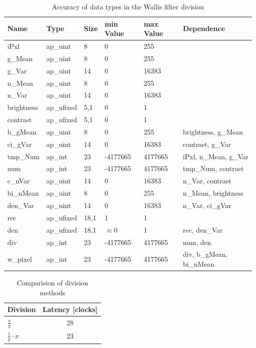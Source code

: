 \begin{table}[t!]
    \centering
    \begin{tabularx}{\textwidth}{l l l l l l}
        \toprule
        Name & Type & Size & min Value & max Value & Dependence \\
        \midrule
        iPxl & ap\_uint & 8 & 0 & 255 & \\
        g\_Mean & ap\_uint & 8 & 0 & 255 &  \\
        g\_Var & ap\_uint & 14 & 0 & 16383 &  \\
        n\_Mean & ap\_uint & 8 & 0 & 255 &  \\
        n\_Var & ap\_uint & 14 & 0 & 16383 &  \\
        brightness & ap\_ufixed & 5,1 & 0 & 1 &  \\
        contrast & ap\_ufixed & 5,1 & 0 & 1 &  \\
        b\_gMean & ap\_uint & 8 & 0 & 255 &  brightness, g\_Mean\\
        ci\_gVar & ap\_uint & 14 & 0 & 16383 &  contrast, g\_Var\\
        tmp\_Num & ap\_int & 23 & -4177665 & 4177665 &  iPxl, n\_Mean, g\_Var \\
        num & ap\_int & 23 & -4177665 & 4177665 &  tmp\_Num, contrast \\
        c\_nVar & ap\_uint & 14 & 0 & 16383 &  n\_Var, contrast \\
        bi\_nMean & ap\_uint & 8 & 0 & 255 &  n\_Mean, brightness \\
        den\_Var & ap\_uint & 14 & 0 & 16383 &  n\_Var, ci\_gVar \\
        rec & ap\_ufixed & 18,1 & 1 & 1 &   \\
        den & ap\_ufixed & 18,1 & $\approx$0 & 1 &  rec, den\_Var \\
        div & ap\_int & 23 & -4177665 & 4177665 &  num, den \\
        w\_pixel & ap\_int & 23 & -4177665 & 4177665 &  div, b\_gMean, bi\_nMean \\
        \bottomrule
    \end{tabularx}
    \caption{Accuracy of data types in the Wallis filter division}
    \label{tab:datatypes}
\end{table}

\begin{table}[tb!]
    \centering
    \begin{tabular}{l c}
        \toprule
        Division & Latency [clocks]  \\
        \midrule
        $\frac{x}{y}$ & 28 
        \\
        $\frac{1}{y} \cdot x$ & 23 
        \\
        \bottomrule
    \end{tabular}
    \caption{Comparision of division methods}
    \label{tab:c_div}
\end{table}


